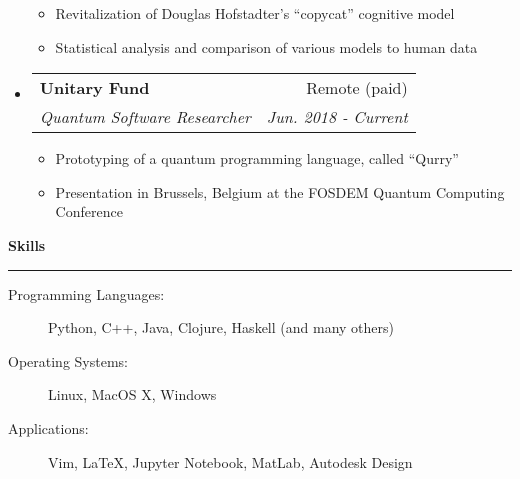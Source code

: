 \documentclass[letterpaper,11pt]{article}
\makeatletter
\newcommand{\sectionline}{
    \noindent\rule[0.5ex]{\linewidth}{0.5pt}
}
\newcommand{\resitem}[1]{\item #1 \vspace{-3pt}}
\newcommand{\resheading}[1]{
    {\large \textbf{#1}}
    \sectionline
}
\newcommand{\colfill}{@{\extracolsep{\fill}}}
\newcommand{\ressubheading}[4]{
\begin{tabular*}{6.5in}{l\colfill r}
		\textbf{#1} & #2 \\
		\textit{#3} & \textit{#4} \\
\end{tabular*}\vspace{-6pt}}
\makeatother
\begin{document}
\begin{itemize}
 	\begin{itemize}
 		\resitem{Revitalization of Douglas Hofstadter's ``copycat'' cognitive model}
 		\resitem{Statistical analysis and comparison of various models to human data}
 	\end{itemize}
 \item
     \ressubheading{Unitary Fund}{Remote (paid)}{Quantum Software Researcher}{Jun. 2018 - Current}
 	\begin{itemize}
            \resitem{Prototyping of a quantum programming language, called ``Qurry''}
            \resitem{Presentation in Brussels, Belgium at the FOSDEM Quantum Computing Conference}
 	\end{itemize}
\end{itemize}

\resheading{Skills}
\begin{description}
    \item[Programming Languages:] 
        Python, C++, Java, Clojure, Haskell (and many others)
    \item[Operating Systems:]
        Linux, MacOS X, Windows
    \item[Applications:]
        Vim, \LaTeX, Jupyter Notebook, MatLab, Autodesk Design

\end{description}
\end{document}
